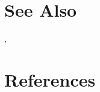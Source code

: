 

\section{See Also} %
\label{sec:rbaSchroeder_see_also}
\texttt{},\quad \texttt{}

\section{References} %
\label{sec:rbaSchroeder_references}



